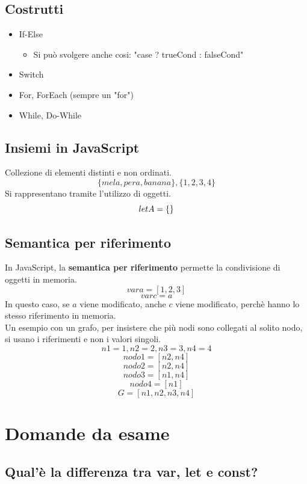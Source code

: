 \documentclass[12pt]{article}
\let\oldsection\section
\renewcommand{\section}{\clearpage\oldsection}
\begin{document}
\subsection{Costrutti}
\begin{itemize}
  \item If-Else 
  \begin{itemize}
    \item Si può svolgere anche cosi: "case ? trueCond : falseCond"
  \end{itemize}
  \item Switch
  \item For, ForEach (sempre un "for")
  \item While, Do-While
\end{itemize}

\subsection{Insiemi in JavaScript}
Collezione di elementi distinti e non ordinati.\\
\[
\{mela, pera, banana\}, \{1,2,3,4\}
\]
Si rappresentano tramite l'utilizzo di oggetti.
\[
let A = \{\}\\
\]

\subsection{Semantica per riferimento}
In JavaScript, la \textbf{semantica per riferimento} permette la condivisione di oggetti in memoria.
\[
var a = [1,2,3]
\]
\[
var c = a
\]
In questo caso, se $a$ viene modificato, anche $c$ viene modificato, perchè hanno lo stesso riferimento in memoria.\\
Un esempio con un grafo, per insistere che più nodi sono collegati al solito nodo, si usano i riferimenti e non i valori singoli.
\[
n1 = 1, n2 = 2, n3 = 3, n4 = 4
\]
\[
nodo1 = [n2,n4]
\]
\[
nodo2 = [n2,n4]
\]
\[
nodo3 = [n1,n4]
\]
\[
nodo4 = [n1]
\]
\[
G = [n1,n2,n3,n4]
\]
\section{Domande da esame}
\subsection{Qual'è la differenza tra var, let e const?}
\end{document}

